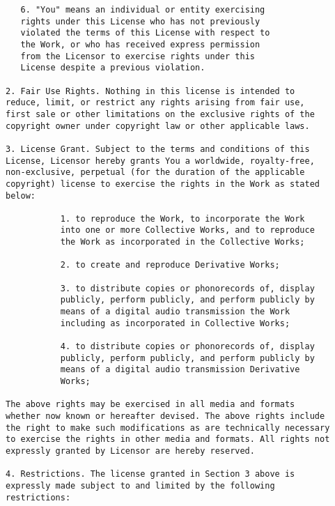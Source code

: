 \begin{verbatim}
   6. "You" means an individual or entity exercising
   rights under this License who has not previously
   violated the terms of this License with respect to
   the Work, or who has received express permission
   from the Licensor to exercise rights under this
   License despite a previous violation.

2. Fair Use Rights. Nothing in this license is intended to
reduce, limit, or restrict any rights arising from fair use,
first sale or other limitations on the exclusive rights of the
copyright owner under copyright law or other applicable laws.

3. License Grant. Subject to the terms and conditions of this
License, Licensor hereby grants You a worldwide, royalty-free,
non-exclusive, perpetual (for the duration of the applicable
copyright) license to exercise the rights in the Work as stated
below:

           1. to reproduce the Work, to incorporate the Work
           into one or more Collective Works, and to reproduce
           the Work as incorporated in the Collective Works;
        
           2. to create and reproduce Derivative Works;
        
           3. to distribute copies or phonorecords of, display
           publicly, perform publicly, and perform publicly by
           means of a digital audio transmission the Work
           including as incorporated in Collective Works;
        
           4. to distribute copies or phonorecords of, display
           publicly, perform publicly, and perform publicly by
           means of a digital audio transmission Derivative
           Works;

The above rights may be exercised in all media and formats
whether now known or hereafter devised. The above rights include
the right to make such modifications as are technically necessary
to exercise the rights in other media and formats. All rights not
expressly granted by Licensor are hereby reserved.

4. Restrictions. The license granted in Section 3 above is
expressly made subject to and limited by the following
restrictions:


\end{verbatim}
